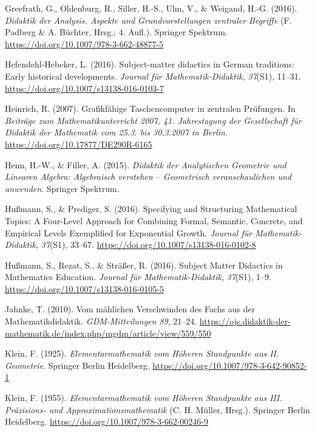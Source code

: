 \documentclass[
]{scrbook}
\newlength{\cslhangindent}
\newenvironment{CSLReferences}[2] %
 {\begin{list}{}{%
  \setlength{\itemindent}{0pt}
  \setlength{\leftmargin}{0pt}
  \setlength{\parsep}{0pt}
  \ifodd #1
   \setlength{\leftmargin}{\cslhangindent}
   \setlength{\itemindent}{-1\cslhangindent}
  \fi
  \setlength{\itemsep}{#2\baselineskip}}}
 {\end{list}}
\theoremstyle{definition}
\theoremstyle{definition}
\theoremstyle{definition}
\theoremstyle{definition}
\theoremstyle{remark}
\begin{document}
\begin{CSLReferences}{1}{0}
Greefrath, G., Oldenburg, R., Siller, H.-S., Ulm, V., \& Weigand, H.-G. (2016). \emph{Didaktik der {Analysis}. {Aspekte} und {Grundvorstellungen} zentraler {Begriffe}} (F. Padberg \& A. Büchter, Hrsg.; 4. Aufl.). Springer Spektrum. \url{https://doi.org/10.1007/978-3-662-48877-5}

Hefendehl-Hebeker, L. (2016). Subject-matter didactics in {German} traditions: {Early} historical developments. \emph{Journal für Mathematik-Didaktik}, \emph{37}(S1), 11--31. \url{https://doi.org/10.1007/s13138-016-0103-7}

Heinrich, R. (2007). Grafikfähige {Taschencomputer} in zentralen {Prüfungen}. In \emph{Beiträge zum {Mathematikunterricht} 2007, 41. {Jahrestagung} der {Gesellschaft} für {Didaktik} der {Mathematik} vom 25.3. bis 30.3.2007 in {Berlin}}. \url{https://doi.org/10.17877/DE290R-6165}

Henn, H.-W., \& Filler, A. (2015). \emph{Didaktik der {Analytischen} {Geometrie} und {Linearen} {Algebra}: {Algebraisch} verstehen -- {Geometrisch} veranschaulichen und anwenden}. Springer Spektrum.

Hußmann, S., \& Prediger, S. (2016). Specifying and Structuring Mathematical Topics: A Four-Level Approach for Combining Formal, Semantic, Concrete, and Empirical Levels Exemplified for Exponential Growth. \emph{Journal für Mathematik-Didaktik}, \emph{37}(S1), 33--67. \url{https://doi.org/10.1007/s13138-016-0102-8}

Hußmann, S., Rezat, S., \& Sträßer, R. (2016). Subject {Matter} {Didactics} in {Mathematics} {Education}. \emph{Journal für Mathematik-Didaktik}, \emph{37}(S1), 1--9. \url{https://doi.org/10.1007/s13138-016-0105-5}

Jahnke, T. (2010). Vom mählichen {Verschwinden} des {Fachs} aus der {Mathematikdidaktik}. \emph{GDM-Mitteilungen 89}, 21--24. \url{https://ojs.didaktik-der-mathematik.de/index.php/mgdm/article/view/559/550}

Klein, F. (1925). \emph{Elementarmathematik vom {Höheren} {Standpunkte} aus {II}. {Geometrie}}. Springer Berlin Heidelberg. \url{https://doi.org/10.1007/978-3-642-90852-1}

Klein, F. (1955). \emph{Elementarmathematik vom {Höheren} {Standpunkte} aus {III}. {Präzisions}- und {Approximationsmathematik}} (C. H. Müller, Hrsg.). Springer Berlin Heidelberg. \url{https://doi.org/10.1007/978-3-662-00246-9}


\end{CSLReferences}
\end{document}
